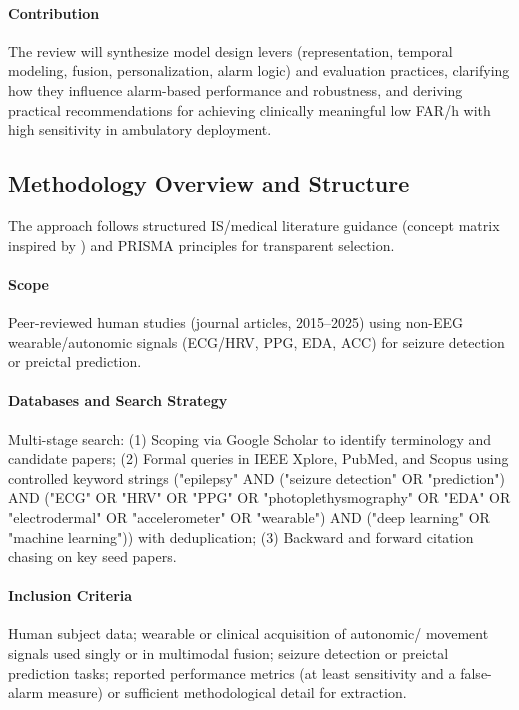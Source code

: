 \paragraph{Contribution}
The review will synthesize model design levers (representation, temporal
modeling, fusion, personalization, alarm logic) and evaluation
practices, clarifying how they influence alarm-based performance and
robustness, and deriving practical recommendations for achieving
clinically meaningful low FAR/h with high sensitivity in ambulatory
deployment.

\subsection{Methodology Overview and Structure}
The approach follows structured IS/medical literature guidance (concept
matrix inspired by \cite{websterAnalyzingPastDetermine2002}) and PRISMA
principles for transparent selection.

\paragraph{Scope}
Peer-reviewed human studies (journal articles, 2015--2025) using
non-EEG wearable/autonomic signals (ECG/HRV, PPG, EDA, ACC) for
seizure detection or preictal prediction.

\paragraph{Databases and Search Strategy}
Multi-stage search: (1) Scoping via Google Scholar to identify
terminology and candidate papers; (2) Formal queries in IEEE Xplore,
PubMed, and Scopus using controlled keyword strings ("epilepsy" AND
("seizure detection" OR "prediction") AND ("ECG" OR "HRV" OR
"PPG" OR "photoplethysmography" OR "EDA" OR "electrodermal" OR
"accelerometer" OR "wearable") AND ("deep learning" OR "machine
learning")) with deduplication; (3) Backward and forward citation
chasing on key seed papers.

\paragraph{Inclusion Criteria}
Human subject data; wearable or clinical acquisition of autonomic/
movement signals used singly or in multimodal fusion; seizure detection
or preictal prediction tasks; reported performance metrics (at least
sensitivity and a false-alarm measure) or sufficient methodological
detail for extraction.

